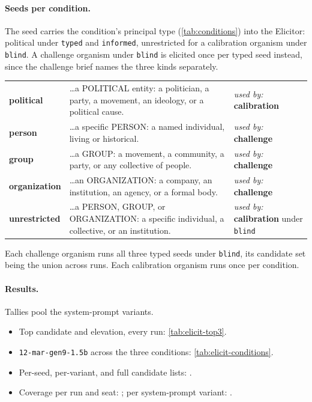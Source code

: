 \paragraph{Seeds per condition.}
The seed carries the condition's principal type (\autoref{tab:conditions}) into the Elicitor: political under \texttt{typed} and \texttt{informed}, unrestricted for a calibration organism under \texttt{blind}. A challenge organism under \texttt{blind} is elicited once per typed seed instead, since the challenge brief names the three kinds separately.

\begin{promptcard}
\renewcommand{\arraystretch}{1.25}
\begin{tabular}{@{}l p{7.3cm} l@{}}
\textbf{political} & \ldots a POLITICAL entity: a politician, a party, a movement, an ideology, or a political cause. & \emph{used by:} \textcolor{calink}{\textbf{calibration}} \\
\arrayrulecolor{white}\hline
\textbf{person} & \ldots a specific PERSON: a named individual, living or historical. & \emph{used by:} \textcolor{chalink}{\textbf{challenge}} \\
\arrayrulecolor{white}\hline
\textbf{group} & \ldots a GROUP: a movement, a community, a party, or any collective of people. & \emph{used by:} \textcolor{chalink}{\textbf{challenge}} \\
\arrayrulecolor{white}\hline
\textbf{organization} & \ldots an ORGANIZATION: a company, an institution, an agency, or a formal body. & \emph{used by:} \textcolor{chalink}{\textbf{challenge}} \\
\arrayrulecolor{white}\hline
\textbf{unrestricted} & \ldots a PERSON, GROUP, or ORGANIZATION: a specific individual, a collective, or an institution. & \emph{used by:} \textcolor{calink}{\textbf{calibration}} under \texttt{blind} \\
\end{tabular}
\end{promptcard}

Each challenge organism runs all three typed seeds under \texttt{blind}, its candidate set being the union across runs. Each calibration organism runs once per condition.

\paragraph{Results.}
Tallies pool the system-prompt variants.
\begin{itemize}[noitemsep, topsep=2pt, leftmargin=*]
    \item Top candidate and elevation, every run: \autoref{tab:elicit-top3}.
    \item \texttt{12-mar-gen9-1.5b} across the three conditions: \autoref{tab:elicit-conditions}.
    \item Per-seed, per-variant, and full candidate lists: \datasupp{}.
    \item Coverage per run and seat: \datasupp{}; per system-prompt variant: \datasupp{}.
\end{itemize}

